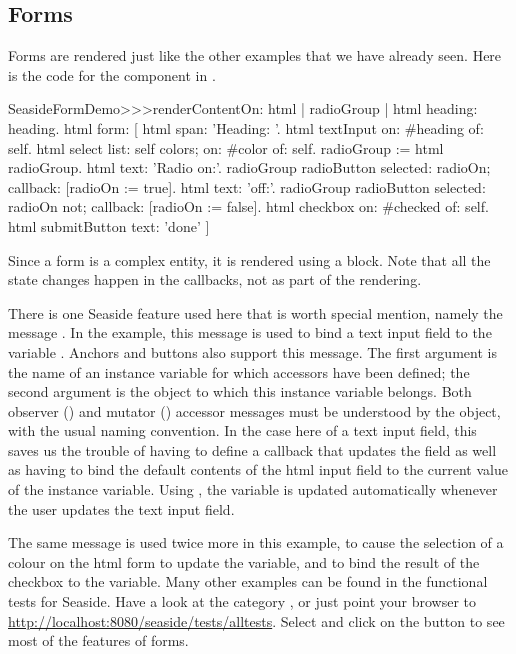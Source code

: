 \documentclass[a4paper,10pt,twoside]{book}
\begin{document}
{{

\subsection{Forms}

Forms are rendered just like the other examples that we have already seen.
Here is the code for the  component in .

\begin{code}{}
SeasideFormDemo>>>renderContentOn: html
	| radioGroup |
	html heading: heading.
	html form: [
		html span: 'Heading: '.
		html textInput on: #heading of: self.
		html select
			list: self colors;
			on: #color of: self.
		radioGroup := html radioGroup.
		html text: 'Radio on:'.
		radioGroup radioButton
			selected: radioOn;
			callback: [radioOn := true].
		html text: 'off:'.
		radioGroup radioButton
			selected: radioOn not;
			callback: [radioOn := false].
		html checkbox on: #checked of: self.
		html submitButton
			text: 'done' ]
\end{code}{}

Since a form is a complex entity, it is rendered using a block.
Note that all the state changes happen in the callbacks, not as part of the rendering.

There is one Seaside feature used here that is worth special mention, namely the message .
In the example, this message is used to bind a text input field to the variable .
Anchors and buttons also support this message.
The first argument is the name of an instance variable for which accessors have been defined;  the second argument is the object to which this instance variable belongs.
Both observer () and mutator () accessor messages must be understood by the object, with the usual naming convention.
In the case here of a text input field, this saves us the trouble of having to define a callback that updates the field as well as having to bind the default contents of the html input field to the current value of the instance variable.
Using , the  variable is updated automatically whenever the user updates the text input field.

The same message is used twice more in this example, to cause the selection of a colour on the html form to update the  variable, and to bind the result of the checkbox to the  variable.
Many other examples can be found in the functional tests for Seaside.
Have a look at the category , or just point your browser to \url{http://localhost:8080/seaside/tests/alltests}.
Select  and click on the  button to see most of the features of forms.

}}
\end{document}
